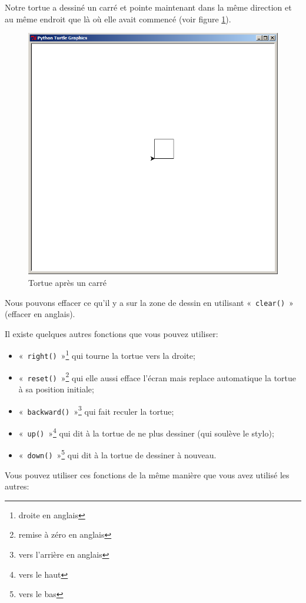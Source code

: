 Notre tortue a dessiné un carré et pointe maintenant dans la même direction et au même endroit que là où elle avait commencé (voir figure \ref{fig:tcar}).
\begin{figure}[h!]
\centering
\includegraphics[scale=0.3]{images/tcar.png}
\caption{Tortue après un carré}
\label{fig:tcar}
\end{figure}

Nous pouvons effacer ce qu'il y a sur la zone de dessin en utilisant «~\texttt{clear()}~» (effacer en anglais).

Il  existe quelques autres fonctions que vous pouvez utiliser: 
\begin{itemize}
\item «~\texttt{right()}~»\footnote{droite en anglais} qui tourne la tortue vers la droite;
\item «~\texttt{reset()}~»\footnote{remise à zéro en anglais} qui elle aussi efface l'écran mais replace automatique la tortue à sa position initiale;
\item «~\texttt{backward()}~»\footnote{vers l'arrière en anglais} qui fait reculer la tortue;
\item «~\texttt{up()}~»\footnote{vers le haut} qui dit à la tortue de ne plus dessiner (qui soulève le stylo);
\item «~\texttt{down()}~»\footnote{vers le bas} qui dit à la tortue de dessiner à nouveau.
\end{itemize}
 Vous pouvez utiliser ces fonctions de la même manière que vous avez utilisé les autres:
 
